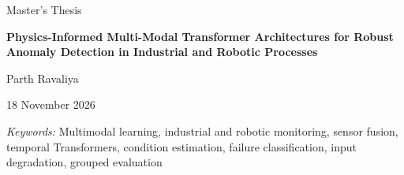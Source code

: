 \documentclass[12pt,a4paper,oneside]{report}
\newcommand{\thesistitle}{Physics-Informed Multi-Modal Transformer Architectures for
Robust Anomaly Detection in Industrial and Robotic Processes}
\begin{document}
\ifdefined\ThesisReviewCopy
\else
\hypersetup{pageanchor=false}
\begin{titlepage}
\centering
\vspace*{17mm}
{\large Master's Thesis\par}
\vspace{17mm}
{\LARGE\bfseries \thesistitle\par}
\vspace{23mm}
{\Large Parth Ravaliya\par}
\vfill
{\large 18 November 2026\par}
\vspace{8mm}
\end{titlepage}
\hypersetup{pageanchor=true}
\fi
\ThesisAbstractHeading{}
\begingroup\apaprose
\noindent

\textit{Keywords:} Multimodal learning, industrial and robotic monitoring,
sensor fusion, temporal Transformers, condition estimation, failure classification,
input degradation, grouped evaluation\par
\endgroup
\clearpage
\ifdefined\ThesisReviewCopy\else
\tableofcontents\listoffigures\listoftables
\clearpage{}
\fi
\apaprose










\ifdefined\ThesisReviewCopy\else

\clearpage
\printbibliography[heading=bibintoc,title={References}]
\appendix









\fi
\end{document}
